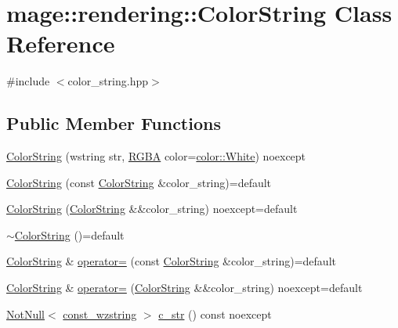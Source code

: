 \hypertarget{classmage_1_1rendering_1_1_color_string}{}\section{mage\+:\+:rendering\+:\+:Color\+String Class Reference}
\label{classmage_1_1rendering_1_1_color_string}


{\ttfamily \#include $<$color\+\_\+string.\+hpp$>$}

\subsection*{Public Member Functions}
\begin{DoxyCompactItemize}
\item 
\mbox{\hyperlink{classmage_1_1rendering_1_1_color_string_af574d1a87d78ed0315f4f6279cd167ae}{Color\+String}} (wstring str, \mbox{\hyperlink{structmage_1_1_r_g_b_a}{R\+G\+BA}} color=\mbox{\hyperlink{namespacemage_1_1color_a39aae61faf172a41b44e2d308e1e4da6}{color\+::\+White}}) noexcept
\item 
\mbox{\hyperlink{classmage_1_1rendering_1_1_color_string_a386454b4a8e08707e8ffff8451509de5}{Color\+String}} (const \mbox{\hyperlink{classmage_1_1rendering_1_1_color_string}{Color\+String}} \&color\+\_\+string)=default
\item 
\mbox{\hyperlink{classmage_1_1rendering_1_1_color_string_a642793608186e9ac9931827ae9f0c57a}{Color\+String}} (\mbox{\hyperlink{classmage_1_1rendering_1_1_color_string}{Color\+String}} \&\&color\+\_\+string) noexcept=default
\item 
\mbox{\hyperlink{classmage_1_1rendering_1_1_color_string_a13ab2218e1cbe99241283214e455f3c9}{$\sim$\+Color\+String}} ()=default
\item 
\mbox{\hyperlink{classmage_1_1rendering_1_1_color_string}{Color\+String}} \& \mbox{\hyperlink{classmage_1_1rendering_1_1_color_string_ab42304d36628f21263a4d545831b3829}{operator=}} (const \mbox{\hyperlink{classmage_1_1rendering_1_1_color_string}{Color\+String}} \&color\+\_\+string)=default
\item 
\mbox{\hyperlink{classmage_1_1rendering_1_1_color_string}{Color\+String}} \& \mbox{\hyperlink{classmage_1_1rendering_1_1_color_string_aa70b60e0c8528306e7473ee0b5bfbe03}{operator=}} (\mbox{\hyperlink{classmage_1_1rendering_1_1_color_string}{Color\+String}} \&\&color\+\_\+string) noexcept=default
\item 
\mbox{\hyperlink{namespacemage_a8769f9d670d6b585ea306cb1062af94b}{Not\+Null}}$<$ \mbox{\hyperlink{namespacemage_ac409e0f2a22292a3a4cd42742994fbf0}{const\+\_\+wzstring}} $>$ \mbox{\hyperlink{classmage_1_1rendering_1_1_color_string_a2706724097d2ad5c187d34db49d86bda}{c\+\_\+str}} () const noexcept

\end{DoxyCompactItemize}
